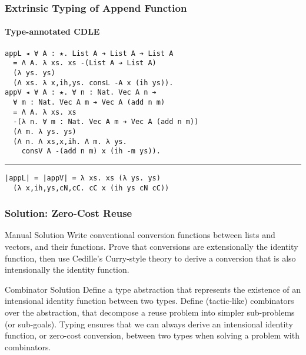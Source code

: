 \documentclass[mathserif,usenames,dvipsnames]{beamer}
\begin{document}
\begin{frame}[fragile]
\frametitle{Extrinsic Typing of Append Function}
\framesubtitle{Type-annotated CDLE}

\begin{verbatim}
appL ◂ ∀ A : ★. List A ➔ List A ➔ List A
  = Λ A. λ xs. xs -(List A ➔ List A)
  (λ ys. ys)
  (Λ xs. λ x,ih,ys. consL -A x (ih ys)).
appV ◂ ∀ A : ★. ∀ n : Nat. Vec A n ➔ 
  ∀ m : Nat. Vec A m ➔ Vec A (add n m)
  = Λ A. λ xs. xs 
  -(λ n. ∀ m : Nat. Vec A m ➔ Vec A (add n m))
  (Λ m. λ ys. ys)
  (Λ n. Λ xs,x,ih. Λ m. λ ys. 
    consV A -(add n m) x (ih -m ys)).
\end{verbatim}

\noindent\rule{\textwidth}{1pt}

\begin{verbatim}
|appL| = |appV| = λ xs. xs (λ ys. ys) 
  (λ x,ih,ys,cN,cC. cC x (ih ys cN cC))
\end{verbatim}

\end{frame}

\begin{frame}
\frametitle{Solution: Zero-Cost Reuse}

\begin{block}{Manual Solution}
Write conventional conversion functions between lists and vectors, and
their functions. Prove that conversions are extensionally the identity
function, then use Cedille's Curry-style theory to derive a conversion
that is also intensionally the identity function.
\end{block}

\begin{block}{Combinator Solution}
Define a type abstraction that represents the existence of an
intensional identity function between two types. Define (tactic-like)
combinators over the abstraction, that decompose a reuse problem into
simpler sub-problems (or sub-goals). Typing ensures that we can always
derive an intensional identity function, or zero-cost conversion,
between two types when solving a problem with combinators.
\end{block}

\end{frame}
\end{document}
